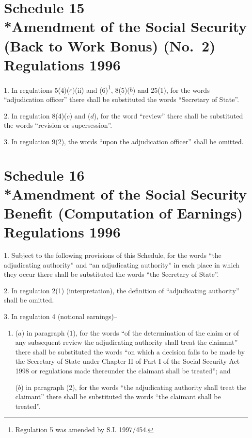 \documentclass[12pt,a4paper]{article}
\begin{document}
\part[Schedule 15 --- Amendment of the Social Security (Back to Work Bonus) (No.\ 2) Regulations 1996]{Schedule 15\\*Amendment of the Social Security (Back to Work Bonus) (No.\ 2) Regulations 1996}

\renewcommand\parthead{--- Schedule 15}

1.  In regulations 5(4)($c$)(ii)  and (6)\footnote{\frenchspacing Regulation 5 was amended by S.I. 1997/454.}, 8(5)($b$)  and 25(1), for the words “adjudication officer” there shall be substituted the words “Secretary of State”.

\medskip

2.  In regulation 8(4)($c$)  and ($d$), for the word “review” there shall be substituted the words “revision or supersession”.

\medskip

3.  In regulation 9(2), the words “upon the adjudication officer” shall be omitted.

\part[Schedule 16 --- Amendment of the Social Security Benefit (Computation of Earnings) Regulations 1996]{Schedule 16\\*Amendment of the Social Security Benefit (Computation of Earnings) Regulations 1996}

\renewcommand\parthead{--- Schedule 16}

1.  Subject to the following provisions of this Schedule, for the words “the adjudicating authority” and “an adjudicating authority” in each place in which they occur there shall be substituted the words “the Secretary of State”.

\medskip

2.  In regulation 2(1) (interpretation), the definition of “adjudicating authority” shall be omitted.

\medskip

3.  In regulation 4 (notional earnings)–
\begin{enumerate}\item[]
($a$) in paragraph (1), for the words “of the determination of the claim or of any subsequent review the adjudicating authority shall treat the claimant” there shall be substituted the words “on which a decision falls to be made by the Secretary of State under Chapter II of Part I of the Social Security Act 1998 or regulations made thereunder the claimant shall be treated”; and

($b$) in paragraph (2), for the words “the adjudicating authority shall treat the claimant” there shall be substituted the words “the claimant shall be treated”.
\end{enumerate}
\end{document}
